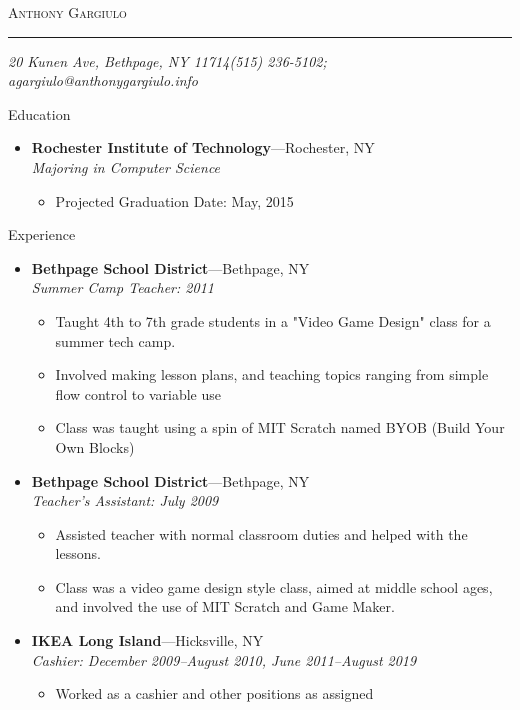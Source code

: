 \documentclass[11pt,oneside]{article}
\makeatletter
\newcommand{\name}{Anthony Gargiulo}
\newcommand{\addr}{20 Kunen Ave, Bethpage, NY 11714}
\newcommand{\phone}{(515) 236-5102}
\newcommand{\email}{agargiulo@anthonygargiulo.info}
\newcommand{\bigname}[1]{
	\begin{center}\fontfamily{phv}\selectfont\Huge\scshape#1\end{center}
}
\newenvironment{ressection}[1]{
	\vspace{4pt}
	{\fontfamily{phv}\selectfont\Large#1}
	\begin{itemize}
	\vspace{3pt}
}{
	\end{itemize}
}
\newcommand{\ressubitem}[1]{
	\vspace{-1pt}
	\item \begin{flushleft} #1 \end{flushleft}
}
\newcommand{\resbigitem}[3]{
	\vspace{-5pt}
	\item
	\textbf{#1}---#2 \\
	\textit{#3}
}
\newenvironment{ressubsec}[3]{
	\resbigitem{#1}{#2}{#3}
	\vspace{-2pt}
	\begin{itemize}
}{
	\end{itemize}
}
\makeatother
\begin{document}
 \selectfont

\bigname{\name}

\vspace{-8pt} \rule{\textwidth}{1pt}

\vspace{-1pt} {\small\itshape \addr \hfill \phone; \email}

\vspace{8 pt}




\begin{ressection}{Education}

	\begin{ressubsec}{Rochester Institute of Technology}{Rochester, NY}{Majoring in Computer Science}
		\ressubitem{Projected Graduation Date: May, 2015}
	\end{ressubsec}

\end{ressection}


\begin{ressection}{Experience}

	\begin{ressubsec}{Bethpage School District}{Bethpage, NY}{Summer Camp Teacher: 2011}
		\ressubitem{Taught 4th to 7th grade students in a "Video Game Design" class for a summer tech camp.}
		\ressubitem{Involved making lesson plans, and teaching topics ranging from simple flow control to variable use}
		\ressubitem{Class was taught using a spin of MIT Scratch named BYOB (Build Your Own Blocks)}
	\end{ressubsec}

	\begin{ressubsec}{Bethpage School District}{Bethpage, NY}{Teacher's Assistant: July 2009}
		\ressubitem{Assisted teacher with normal classroom duties and helped with the lessons.}
		\ressubitem{Class was a video game design style class, aimed at middle school ages, and involved the use of MIT Scratch and Game Maker.}
	\end{ressubsec}

	\begin{ressubsec}{IKEA Long Island}{Hicksville, NY}{Cashier: December 2009--August 2010, June 2011--August 2019}
		\ressubitem{Worked as a cashier and other positions as assigned}
	\end{ressubsec}

\end{ressection}
\end{document}
